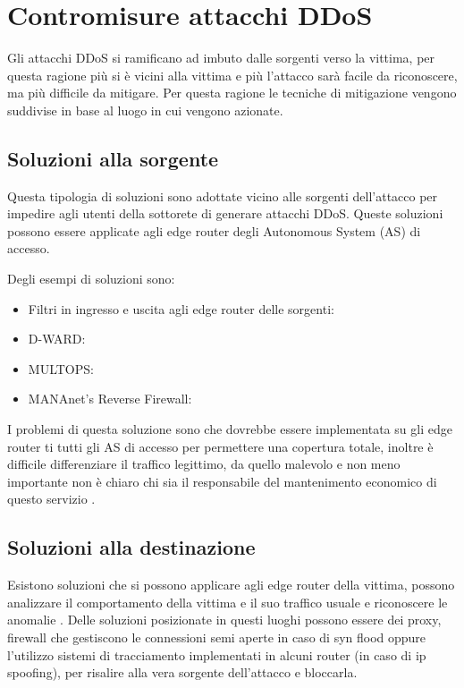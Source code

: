 \section{Contromisure attacchi DDoS}

Gli attacchi DDoS si ramificano ad imbuto dalle sorgenti verso la vittima, per questa ragione più si è vicini alla vittima e più l'attacco sarà facile da riconoscere, ma più difficile da mitigare. Per questa ragione le tecniche di mitigazione vengono suddivise in base al luogo in cui vengono azionate.

\subsection{Soluzioni alla sorgente}
Questa tipologia di soluzioni sono adottate vicino alle sorgenti dell'attacco per impedire agli utenti della sottorete di generare attacchi DDoS. Queste soluzioni possono essere applicate agli edge router degli Autonomous System (AS) di accesso.

Degli esempi di soluzioni sono:

\begin{itemize}
    \item Filtri in ingresso e uscita agli edge router delle sorgenti:
    \item D-WARD:
    \item MULTOPS:
    \item MANAnet’s Reverse Firewall: 
\end{itemize}

I problemi di questa soluzione sono che dovrebbe essere implementata su gli edge router ti tutti gli AS di accesso per permettere una copertura totale, inoltre è difficile differenziare il traffico legittimo, da quello malevolo e non meno importante non è chiaro chi sia il responsabile del mantenimento economico di questo servizio \cite{ddos_survey_1}.

\subsection{Soluzioni alla destinazione}

Esistono soluzioni che si possono applicare agli edge router della vittima, possono analizzare il comportamento della vittima e il suo traffico usuale e riconoscere le anomalie \cite{ddos_survey_1,ddos_survey_2}.
Delle soluzioni posizionate in questi luoghi possono essere dei proxy, firewall che gestiscono le connessioni semi aperte in caso di syn flood oppure l'utilizzo sistemi di tracciamento implementati in alcuni router (in caso di ip spoofing), per risalire alla vera sorgente dell'attacco e bloccarla. %

